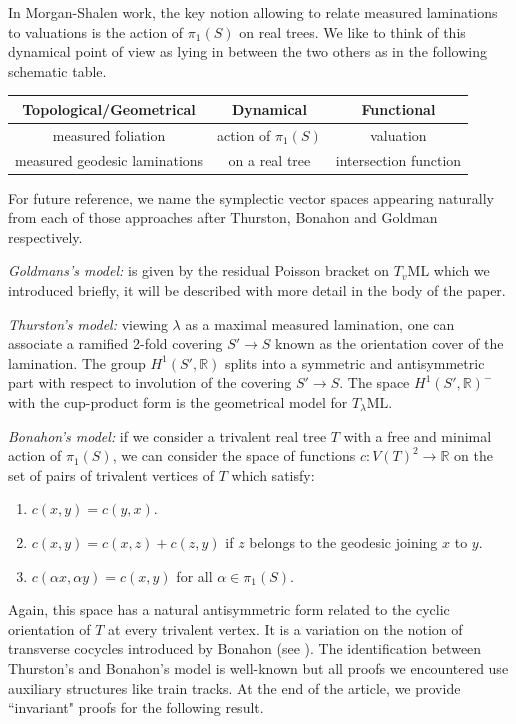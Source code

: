 \documentclass{amsart}
\newcommand{\R}{\mathbb{R}}
\newcommand{\ML}{\mathrm{ML}}
\begin{document}
In Morgan-Shalen work, the key notion allowing to relate measured laminations to valuations is the action of $\pi_1(S)$ on real trees. We like to think of this dynamical point of view as lying in between the two others as in the following schematic table.
\begin{center}
\vspace{5pt}
\begin{tabular}{|c|c|c|}
\hline
Topological/Geometrical & Dynamical & Functional \\
\hline
measured foliation & action of $\pi_1(S)$& valuation\\
measured geodesic laminations & on a real tree  & intersection function\\
\hline
\end{tabular}
\vspace{5pt}
\end{center}

For future reference, we name the symplectic vector spaces appearing naturally from each of those approaches after Thurston, Bonahon and Goldman respectively.

\textit{Goldmans's model:} is given by the residual Poisson bracket on $T_v\ML$ which we introduced briefly, it will be described with more detail in the body of the paper.

\textit{Thurston's model:} viewing $\lambda$ as a maximal measured lamination, one can associate a ramified 2-fold covering $S'\to S$ known as the orientation cover of the lamination. The group $H^1(S',\R)$ splits into a symmetric and antisymmetric part with respect to involution of the covering $S'\to S$. The space $H^1(S',\R)^-$ with the cup-product form is the geometrical model for $T_\lambda \ML$. 

\textit{Bonahon's model:} if we consider a trivalent real tree $T$ with a free and minimal action of $\pi_1(S)$, we can consider the space of functions $c\colon V(T)^2\to \R$ on the set of pairs of trivalent vertices of $T$ which satisfy:
\begin{enumerate}
    \item $c(x,y)=c(y,x)$.
    \item $c(x,y)=c(x,z)+c(z,y)$ if $z$ belongs to the geodesic joining $x$ to $y$.
    \item $c(\alpha x,\alpha y)=c(x,y)$ for all $\alpha\in \pi_1(S)$.
\end{enumerate}
Again, this space has a natural antisymmetric form related to the cyclic orientation of $T$ at every trivalent vertex. It is a variation on the notion of transverse cocycles introduced by Bonahon (see \cite{Bonahon_1996}). 
The identification between Thurston's and Bonahon's model is well-known but all proofs we encountered use auxiliary structures like train tracks. At the end of the article, we provide ``invariant" proofs for the following result. 
\end{document}
